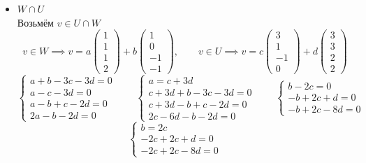 \begin{itemize}
	\item $ W \cap U $ \\
    Возьмём $ v \in U \cap W $
    $$ v \in W \implies v = a
    \begin{pmatrix}
    	1 \\
        1 \\
        1 \\
        2
    \end{pmatrix} + b
    \begin{pmatrix}
    	1 \\
        0 \\
        -1 \\
        -1
    \end{pmatrix}, \qquad v \in U \implies v = c
    \begin{pmatrix}
    	3 \\
        1 \\
        -1 \\
        0
    \end{pmatrix} + d
    \begin{pmatrix}
    	3 \\
        3 \\
        2 \\
        2
    \end{pmatrix} $$
    $$
    \begin{cases}
    	a + b - 3c - 3d = 0 \\
        a - c - 3d = 0 \\
        a - b + c - 2d = 0 \\
        2a - b - 2d = 0
    \end{cases} \qquad
    \begin{cases}
    	a = c + 3d \\
        c + 3d + b - 3c - 3d = 0 \\
        c + 3d - b + c - 2d = 0 \\
        2c - 6d - b - 2d = 0
    \end{cases} \qquad
    \begin{cases}
    	b - 2c = 0 \\
        -b + 2c + d = 0 \\
        -b + 2c - 8d = 0
    \end{cases} $$
    $$
    \begin{cases}
    	b = 2c \\
        -2c + 2c + d = 0 \\
        -2c + 2c - 8d = 0
    \end{cases} \qquad
$$
\end{itemize}

